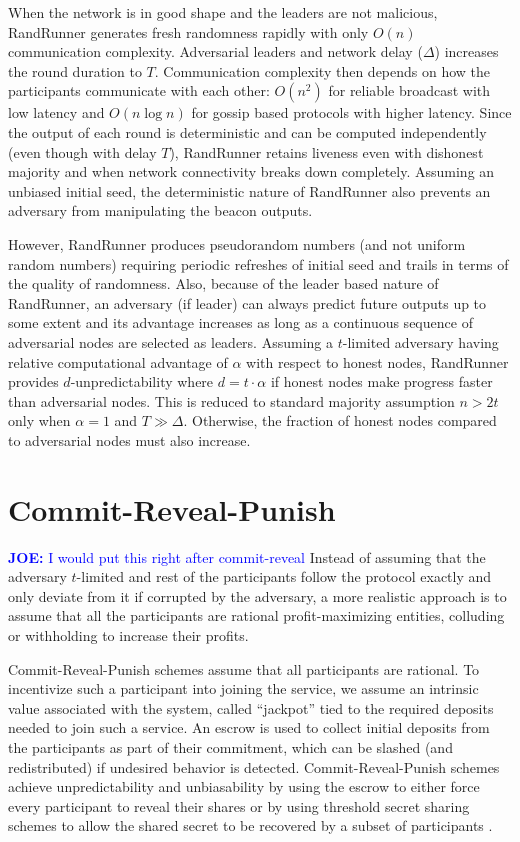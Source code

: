 \documentclass[letterpaper,twocolumn,10pt]{article}
\theoremstyle{definition}
\theoremstyle{remark}
\newcommand{\joenote}[1]{\textcolor{blue}{\textbf{JOE:} #1}}
\begin{document}
When the network is in good shape and the leaders are not malicious, RandRunner generates fresh randomness rapidly with only $O(n)$ communication complexity. Adversarial leaders and network delay ($\Delta$) increases the round duration to $T$. Communication complexity then depends on how the participants communicate with each other: $O(n^2)$ for reliable broadcast with low latency and $O(n \log n)$ for gossip based protocols with higher latency. Since the output of each round is deterministic and can be computed independently (even though with delay $T$), RandRunner retains liveness even with dishonest majority and when network connectivity breaks down completely. Assuming an unbiased initial seed, the deterministic nature of RandRunner also prevents an adversary from manipulating the beacon outputs. 

However, RandRunner produces pseudorandom numbers (and not uniform random numbers) requiring periodic refreshes of initial seed and trails in terms of the quality of randomness. Also, because of the leader based nature of RandRunner, an adversary (if leader) can always predict future outputs up to some extent and its advantage increases as long as a continuous sequence of adversarial nodes are selected as leaders. Assuming a $t$-limited adversary having relative computational advantage of $\alpha$ with respect to honest nodes, RandRunner provides $d$-unpredictability where $d = t \cdot \alpha$ if honest nodes make progress faster than adversarial nodes. This is reduced to standard majority assumption $n > 2t$ only when $\alpha = 1$ and $T \gg \Delta$. Otherwise, the fraction of honest nodes compared to adversarial nodes must also increase.

\section{Commit-Reveal-Punish}
\joenote{I would put this right after commit-reveal}
\label{section:commit-reveal-punish}
Instead of assuming that the adversary $t$-limited and rest of the participants follow the protocol exactly and only deviate from it if corrupted by the adversary, a more realistic approach is to assume that all the participants are rational profit-maximizing entities, colluding or withholding to increase their profits. 

Commit-Reveal-Punish schemes assume that all participants are rational. To incentivize such a participant into joining the service, we assume an intrinsic value associated with the system, called ``jackpot'' tied to the required deposits needed to join such a service. An escrow is used to collect initial deposits from the participants as part of their commitment, which can be slashed (and redistributed) if undesired behavior is detected. Commit-Reveal-Punish schemes achieve unpredictability and unbiasability by using the escrow to either force every participant to reveal their shares \cite{youcai2017randao, andrychowicz2014secure, bentov2014use} or by using threshold secret sharing schemes to allow the shared secret to be recovered by a subset of participants \cite{david2020economically}. 
\end{document}
